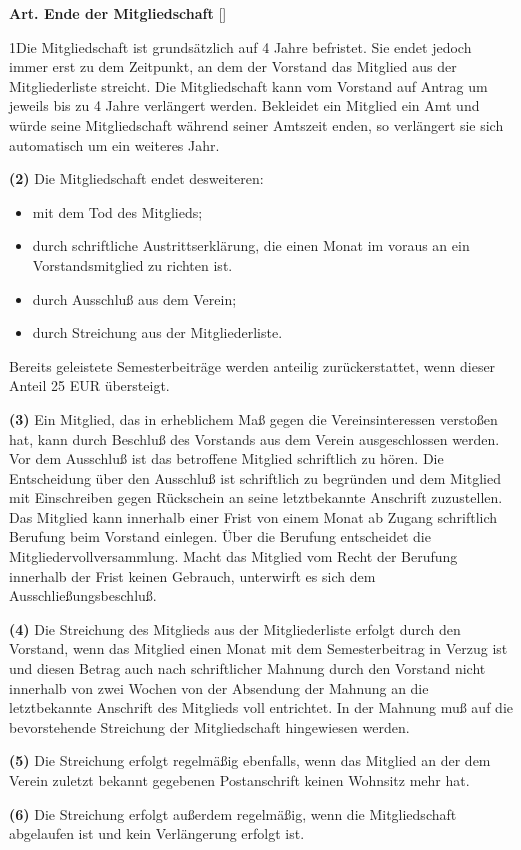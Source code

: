 \documentclass[12pt]{article}
\newcommand{\Satz}[2]{

\begin{samepage}
{\bf (#1)} #2
\end{samepage}
}
\newenvironment{Artikel}[2]{
\bigskip \centerline{{\bf Art. #1} [#2]}
\nopagebreak
}{
}
\begin{document}
\begin{Artikel}{10}{Ende der Mitgliedschaft}

\Satz{1}{Die Mitgliedschaft ist grundsätzlich auf 4 Jahre befristet.
Sie endet jedoch immer erst zu dem Zeitpunkt, an dem der Vorstand das
Mitglied aus der Mitgliederliste streicht.
Die Mitgliedschaft kann vom Vorstand auf Antrag um jeweils bis zu 4 Jahre 
verlängert werden.
Bekleidet ein Mitglied ein Amt und würde seine Mitgliedschaft während seiner
Amtszeit enden, so verlängert sie sich automatisch um ein weiteres Jahr.}

\Satz{2}{Die Mitgliedschaft endet desweiteren:
\begin{itemize}
\item mit dem Tod des Mitglieds;
\item durch schriftliche Austrittserklärung, die einen Monat im voraus an
ein Vorstandsmitglied zu richten ist. 
\item durch Ausschluß aus dem Verein;
\item durch Streichung aus der Mitgliederliste.
\end{itemize}
Bereits geleistete Semesterbeiträge werden anteilig zurückerstattet, wenn
dieser Anteil 25 EUR übersteigt.}

\Satz{3}{Ein Mitglied, das in erheblichem Maß gegen die Vereinsinteressen
verstoßen hat, kann durch Beschluß des Vorstands aus dem Verein ausgeschlossen
werden. Vor dem Ausschluß ist das betroffene Mitglied schriftlich zu hören. Die
Entscheidung über den Ausschluß ist schriftlich zu begründen und dem Mitglied
mit Einschreiben gegen Rückschein an seine letztbekannte Anschrift zuzustellen.
Das Mitglied kann innerhalb einer Frist von einem Monat ab Zugang schriftlich
Berufung beim Vorstand einlegen. Über die Berufung entscheidet die
Mitgliedervollversammlung. Macht das Mitglied vom Recht der Berufung innerhalb
der Frist keinen Gebrauch, unterwirft es sich dem Ausschließungsbeschluß.}

\Satz{4}{Die Streichung des Mitglieds aus der Mitgliederliste erfolgt durch den
Vorstand, wenn das Mitglied einen Monat mit dem Semesterbeitrag in Verzug ist
und diesen Betrag auch nach schriftlicher Mahnung durch den Vorstand nicht
innerhalb von zwei Wochen von der Absendung der Mahnung an die letztbekannte
Anschrift des Mitglieds voll entrichtet. In der Mahnung muß auf die
bevorstehende Streichung der Mitgliedschaft hingewiesen werden.}

\Satz{5}{Die Streichung erfolgt regelmäßig ebenfalls, wenn das Mitglied an der
dem Verein zuletzt bekannt gegebenen Postanschrift keinen Wohnsitz mehr hat.}

\Satz{6}{Die Streichung erfolgt außerdem regelmäßig, wenn die Mitgliedschaft
abgelaufen ist und kein Verlängerung erfolgt ist.}

\end{Artikel}
\end{document}
